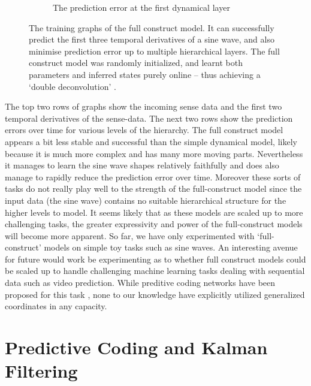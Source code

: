 \begin{figure}[H]
\begin{subfigure}{.3\linewidth}
    \caption{The prediction error at the first dynamical layer}%
\end{subfigure}
   \hfill
\caption{The training graphs of the full construct model. It can successfully predict the first three temporal derivatives of a sine wave, and also minimise prediction error up to multiple hierarchical layers. The full construct model was randomly initialized, and learnt both parameters and inferred states purely online -- thus achieving a `double deconvolution' \citep{friston2008DEM}.}
\end{figure}

The top two rows of graphs show the incoming sense data and the first two temporal derivatives of the sense-data. The next two rows show the prediction errors over time for various levels of the hierarchy. The full construct model appears a bit less stable and successful than the simple dynamical model, likely because it is much more complex and has many more moving parts. Nevertheless it manages to learn the sine wave shapes relatively faithfully and does also manage to rapidly reduce the prediction error over time. Moreover these sorts of tasks do not really play well to the strength of the full-construct model since the input data (the sine wave) contains no suitable hierarchical structure for the higher levels to model. It seems likely that as these models are scaled up to more challenging tasks, the greater expressivity and power of the full-construct models will become more apparent. So far, we have only experimented with `full-construct' models on simple toy tasks such as sine waves. An interesting avenue for future would work be experimenting as to whether full construct models could be scaled up to handle challenging machine learning tasks dealing with sequential data such as video prediction. While preditive coding networks have been proposed for this task \citep{lotter2016deep}, none to our knowledge have explicitly utilized generalized coordinates in any capacity.

\section{Predictive Coding and Kalman Filtering}

